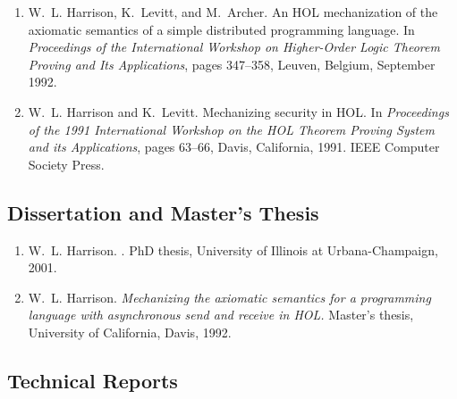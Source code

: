 \documentclass[12pt]{article} %
\begin{document}
\begin{enumerate}[leftmargin=0.0mm]
\item
W.~L. Harrison, K.~Levitt, and M.~Archer.
\newblock An {HOL} mechanization of the axiomatic semantics of a simple
  distributed programming language.
\newblock In {\em Proceedings of the International Workshop on Higher-Order
  Logic Theorem Proving and Its Applications}, pages 347--358, Leuven, Belgium,
  September 1992.

\item
W.~L. Harrison and K.~Levitt.
\newblock Mechanizing security in {HOL}.
\newblock In {\em Proceedings of the 1991 International Workshop on the {HOL}
  Theorem Proving System and its Applications}, pages 63--66, Davis,
  California, 1991. IEEE Computer Society Press.



\end{enumerate}


\subsection*{Dissertation and Master's Thesis}


\begin{enumerate}[leftmargin=0.0mm]

\item
W.~L. Harrison.
.
\newblock PhD thesis, University of Illinois at Urbana-Champaign, 2001.

\item
W.~L. Harrison.
\newblock \emph{Mechanizing the axiomatic semantics for a programming language with
  asynchronous send and receive in {HOL}.}
\newblock Master's thesis, University of California, Davis, 1992.


\thispagestyle{fancyplain}
\fancyhf{}
\renewcommand{\headrulewidth}{0pt}
\cfoot{ \fancyplain{}{\thepage} }

\end{enumerate}

\subsection*{Technical Reports}
\end{document}
